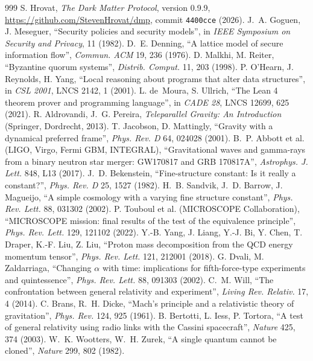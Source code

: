 \documentclass[11pt,a4paper]{article}
\theoremstyle{definition}
\theoremstyle{remark}
\theoremstyle{definition}
\begin{document}
\begin{thebibliography}{999}
 S. Hrovat, \emph{The Dark Matter Protocol}, version 0.9.9, \url{https://github.com/StevenHrovat/dmp}, commit
\texttt{4400cce} (2026).
 J.~A. Goguen, J. Meseguer, ``Security policies and security models'', in \emph{IEEE Symposium on Security and Privacy}, 11
(1982).
 D.~E. Denning, ``A lattice model of secure information flow'', \emph{Commun. ACM} 19, 236 (1976).
 D. Malkhi, M. Reiter, ``Byzantine quorum systems'', \emph{Distrib. Comput.} 11, 203 (1998).
 P. O'Hearn, J. Reynolds, H. Yang, ``Local reasoning about programs that alter data structures'', in \emph{CSL 2001},
LNCS 2142, 1 (2001).
 L. de~Moura, S. Ullrich, ``The Lean 4 theorem prover and programming language'', in \emph{CADE 28}, LNCS 12699, 625
(2021).
 R. Aldrovandi, J.~G. Pereira, \emph{Teleparallel Gravity: An Introduction} (Springer, Dordrecht, 2013).
 T. Jacobson, D. Mattingly, ``Gravity with a dynamical preferred frame'', \emph{Phys. Rev. D} 64, 024028 (2001).
 B.~P. Abbott et al. (LIGO, Virgo, Fermi GBM, INTEGRAL), ``Gravitational waves and gamma-rays from a binary neutron
star merger: GW170817 and GRB 170817A'', \emph{Astrophys. J. Lett.} 848, L13 (2017).
 J.~D. Bekenstein, ``Fine-structure constant: Is it really a constant?'', \emph{Phys. Rev. D} 25, 1527 (1982).
 H.~B. Sandvik, J.~D. Barrow, J. Magueijo, ``A simple cosmology with a varying fine structure constant'', \emph{Phys. Rev.
Lett.} 88, 031302 (2002).
 P. Touboul et al. (MICROSCOPE Collaboration), ``MICROSCOPE mission: final results of the test of the equivalence
principle'', \emph{Phys. Rev. Lett.} 129, 121102 (2022).
 Y.-B. Yang, J. Liang, Y.-J. Bi, Y. Chen, T. Draper, K.-F. Liu, Z. Liu, ``Proton mass decomposition from the QCD energy
momentum tensor'', \emph{Phys. Rev. Lett.} 121, 212001 (2018).
 G. Dvali, M. Zaldarriaga, ``Changing $\alpha$ with time: implications for fifth-force-type experiments and quintessence'',
\emph{Phys. Rev. Lett.} 88, 091303 (2002).
 C.~M. Will, ``The confrontation between general relativity and experiment'', \emph{Living Rev. Relativ.} 17, 4 (2014).
 C. Brans, R.~H. Dicke, ``Mach's principle and a relativistic theory of gravitation'', \emph{Phys. Rev.} 124, 925 (1961).
 B. Bertotti, L. Iess, P. Tortora, ``A test of general relativity using radio links with the Cassini spacecraft'',
\emph{Nature} 425, 374 (2003).
 W.~K. Wootters, W.~H. Zurek, ``A single quantum cannot be cloned'', \emph{Nature} 299, 802 (1982).

\end{thebibliography}
\end{document}
